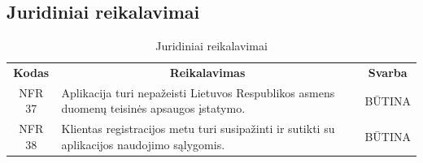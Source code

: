 \documentclass{VUMIFPSkursinis}
\begin{document}
\subsection{Juridiniai reikalavimai}
\begin{center}
	\begin{table}[H]
	\caption{Juridiniai reikalavimai}
	\begin{tabular}{|p{2cm}|p{}|p{}|}
	\hline
	    \rowcolor{lightgray}
		\multicolumn{3}{|c|}{Juridiniai reikalavimai}\\
		
	\hline
		\multicolumn{1}{|c|}{{\bfseries Kodas}}&
		\multicolumn{1}{|c|}{{\bfseries Reikalavimas}}&
		\multicolumn{1}{|c|}{{\bfseries Svarba}}\\
	\hline 	
		\multicolumn{1}{|c|}{NFR 37}&
		{Aplikacija turi nepažeisti Lietuvos Respublikos asmens duomenų teisinės apsaugos įstatymo.}&
		\multicolumn{1}{|c|}{BŪTINA}\\	
	
	\hline 	
		\multicolumn{1}{|c|}{NFR 38}&
		{Klientas registracijos metu turi susipažinti ir sutikti su aplikacijos naudojimo sąlygomis.}&
		\multicolumn{1}{|c|}{BŪTINA}\\	
	
	\hline 	
	\end{tabular}
	
	\label{table:Juridiniaireikalavimai}
	\end{table}

\end{center}

\pagebreak

\end{document}
